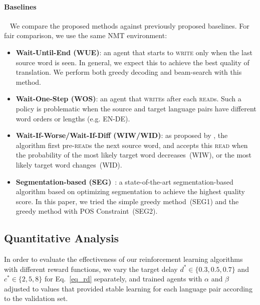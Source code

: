 \paragraph{Baselines}~ We compare the proposed methods against previously proposed baselines.
For fair comparison, we use the same NMT environment:
\begin{itemize}[leftmargin=*]

\item \textbf{Wait-Until-End (WUE)}: an agent that starts to \textsc{write} only when the last source word is seen. In general, we expect this to achieve the best quality of translation. We perform both greedy decoding and beam-search with this method.

\item \textbf{Wait-One-Step (WOS)}: an agent that \textsc{write}s after each \textsc{read}s. %
Such a policy is problematic when the source and target language pairs have different word orders or lengths (e.g. EN-DE). %

\item \textbf{Wait-If-Worse/Wait-If-Diff (WIW/WID)}: as proposed by \citep{cho2016can}, the algorithm first pre-\textsc{read}s the next source word, and accepts this \textsc{read} when the probability of the most likely target word decreases~(WIW), or the most likely target word changes~(WID). 

\item \textbf{Segmentation-based (SEG)}~\cite{oda-EtAl:2014:P14-2}: a state-of-the-art segmentation-based algorithm based on optimizing segmentation to achieve the highest quality score. In this paper, we tried the simple greedy method~(SEG1) and the greedy method with POS Constraint~(SEG2).
\end{itemize}

\subsection{Quantitative Analysis}

In order to evaluate the effectiveness of our reinforcement learning algorithms with different reward functions, we vary the target delay $d^* \in \{0.3, 0.5, 0.7\}$ and $c^* \in \{2, 5, 8\}$ for Eq.~\ref{eq_rd} separately, and trained agents with $\alpha$ and $\beta$ adjusted to values that provided stable learning for each language pair according to the validation set.

